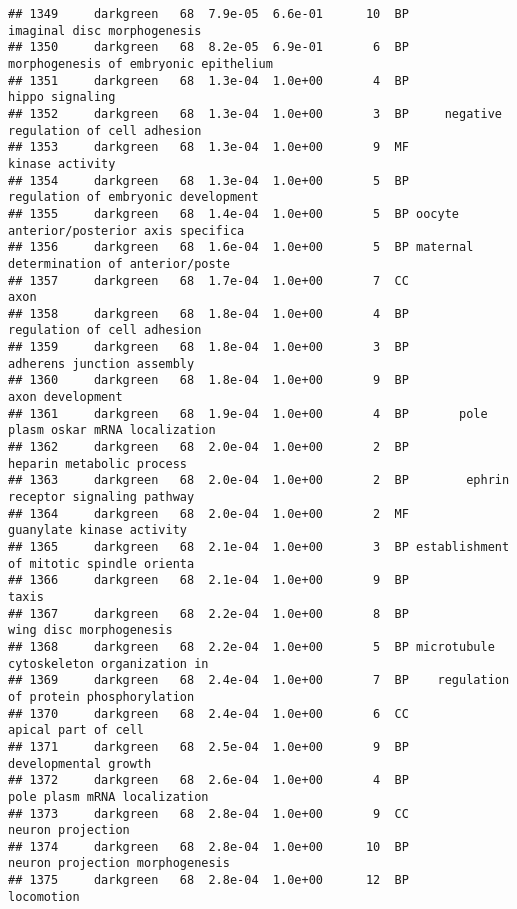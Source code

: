 \documentclass[]{article}
\begin{document}
\begin{verbatim}
## 1349     darkgreen   68  7.9e-05  6.6e-01      10  BP              imaginal disc morphogenesis
## 1350     darkgreen   68  8.2e-05  6.9e-01       6  BP    morphogenesis of embryonic epithelium
## 1351     darkgreen   68  1.3e-04  1.0e+00       4  BP                          hippo signaling
## 1352     darkgreen   68  1.3e-04  1.0e+00       3  BP     negative regulation of cell adhesion
## 1353     darkgreen   68  1.3e-04  1.0e+00       9  MF                          kinase activity
## 1354     darkgreen   68  1.3e-04  1.0e+00       5  BP      regulation of embryonic development
## 1355     darkgreen   68  1.4e-04  1.0e+00       5  BP oocyte anterior/posterior axis specifica
## 1356     darkgreen   68  1.6e-04  1.0e+00       5  BP maternal determination of anterior/poste
## 1357     darkgreen   68  1.7e-04  1.0e+00       7  CC                                     axon
## 1358     darkgreen   68  1.8e-04  1.0e+00       4  BP              regulation of cell adhesion
## 1359     darkgreen   68  1.8e-04  1.0e+00       3  BP               adherens junction assembly
## 1360     darkgreen   68  1.8e-04  1.0e+00       9  BP                         axon development
## 1361     darkgreen   68  1.9e-04  1.0e+00       4  BP       pole plasm oskar mRNA localization
## 1362     darkgreen   68  2.0e-04  1.0e+00       2  BP                heparin metabolic process
## 1363     darkgreen   68  2.0e-04  1.0e+00       2  BP        ephrin receptor signaling pathway
## 1364     darkgreen   68  2.0e-04  1.0e+00       2  MF                guanylate kinase activity
## 1365     darkgreen   68  2.1e-04  1.0e+00       3  BP establishment of mitotic spindle orienta
## 1366     darkgreen   68  2.1e-04  1.0e+00       9  BP                                    taxis
## 1367     darkgreen   68  2.2e-04  1.0e+00       8  BP                  wing disc morphogenesis
## 1368     darkgreen   68  2.2e-04  1.0e+00       5  BP microtubule cytoskeleton organization in
## 1369     darkgreen   68  2.4e-04  1.0e+00       7  BP    regulation of protein phosphorylation
## 1370     darkgreen   68  2.4e-04  1.0e+00       6  CC                      apical part of cell
## 1371     darkgreen   68  2.5e-04  1.0e+00       9  BP                     developmental growth
## 1372     darkgreen   68  2.6e-04  1.0e+00       4  BP             pole plasm mRNA localization
## 1373     darkgreen   68  2.8e-04  1.0e+00       9  CC                        neuron projection
## 1374     darkgreen   68  2.8e-04  1.0e+00      10  BP          neuron projection morphogenesis
## 1375     darkgreen   68  2.8e-04  1.0e+00      12  BP                               locomotion

\end{verbatim}
\end{document}
